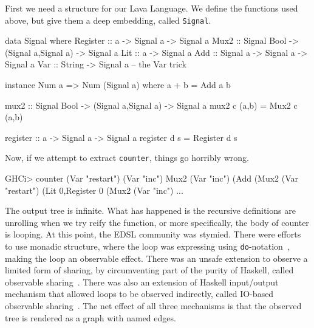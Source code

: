 \documentclass[11pt]{article}
\begin{document}
First we need a structure for our Lava Language. We define the
functions used above, but give them a deep embedding, called \verb|Signal|.
\begin{Code}
        
data Signal where
  Register :: a -> Signal a                      -> Signal a
  Mux2     :: Signal Bool -> (Signal a,Signal a) -> Signal a
  Lit      :: a                                  -> Signal a
  Add      :: Signal a -> Signal a               -> Signal a
  Var      :: String                             -> Signal a -- the Var trick

instance Num a => Num (Signal a) where
  a + b = Add a b

mux2 :: Signal Bool -> (Signal a,Signal a) -> Signal a
mux2 c (a,b) = Mux2 c (a,b)

register :: a -> Signal a -> Signal a
register d s = Register d s
        
\end{Code}
Now, if we attempt to extract \verb|counter|, things go horribly wrong.
\begin{Code}
GHCi> counter (Var "restart") (Var "inc")
Mux2 (Var "inc") (Add (Mux2 (Var "restart") (Lit 0,Register 0 (Mux2 (Var "inc") ...
\end{Code}        
The output tree is infinite.
What has happened is the recursive definitions are unrolling when we try reify the function,
or more specifically, the body of counter is looping. At this point, the EDSL community was
stymied. There were efforts to use monadic structure, where the loop was expressing using
\verb|do|-notation~\cite{Erkok:2000:Recursive-Monad},
making the loop an observable effect. There was an unsafe
extension to observe a limited form of sharing, by circumventing part of the purity of Haskell,
called observable sharing~\cite{Claessen:99:ObserveSharing}.
There was also an extension of Haskell input/output mechanism that allowed loops to
be observed indirectly, called IO-based observable sharing~\cite{Gill:09:TypeSafeReification}. 
The net effect of all three
mechanisms is that the observed tree is rendered as a graph with named edges.
\end{document}
